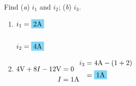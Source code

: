 Find (\emph{a}) $i_1$ and $i_2$; (\emph{b}) $i_3$.
\begin{enumerate}[leftmargin=2cm,labelsep=.5cm,label=\bfseries\alph*)]
	\item $
	\begin{aligned}[t]
	i_1&= \hlbox{2\qw{\A}} \\[5mm]
	i_2&= \hlbox{4\qw{\A}}
	\end{aligned} $
	\\[1cm]
	
	\item $
	\begin{aligned}[t]
	4\qw{\V} + 8I -12\qw{\V} &= 0 \\
	I&=1\qw{\A} 
	\end{aligned}
	\\[5mm]
	\begin{aligned}
	i_3&=4\qw{\A}-(1+2) \\
	&=\hlbox{1\qw{\A}}
	\end{aligned} $
	\\[1cm]
\end{enumerate}